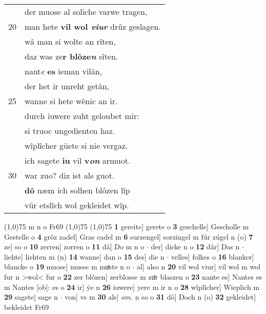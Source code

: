 \documentclass[8pt,a4paper,notitlepage]{article}
\begin{document}
\begin{table}[ht]
\begin{minipage}[t]{0.5\linewidth}
\begin{tabular}{rl}
 & der muose al soliche varwe tragen,\\ 
20 & man hete \textbf{vil wol \textit{viur}} drûz geslagen.\\ 
 & wâ man si wolte an rîten,\\ 
 & daz was ze\textbf{r blôze\textit{n}} sîten.\\ 
 & nant\textit{e} \textbf{es} ieman vilân,\\ 
 & der het ir unreht getân,\\ 
25 & wanne si hete wênic an ir.\\ 
 & durch iuwere zuht geloubet mir:\\ 
 & si truoc ungedienten haz.\\ 
 & wîplîcher güete si nie vergaz.\\ 
 & ich sagete \textbf{iu} vil \textbf{v\textit{on}} armuot.\\ 
30 & war zuo? diz ist als guot.\\ 
 & \textbf{dô} næm ich solhen blôzen lîp\\ 
 & vür etslîch wol gekleidet wîp.\\ 
\end{tabular}
\scriptsize
\line(1,0){75} \newline
m n o Fr69 \newline
\line(1,0){75} \newline
\newline
\line(1,0){75} \newline
\textbf{1} gereite] gerete o \textbf{3} geschelle] Gescholle m Gestelle o \textbf{4} grôz zadel] Gras cadel m \textbf{6} surzengel] sorzingel m fúr zúgel n (o) \textbf{7} ze] so o \textbf{10} zerren] zorren o \textbf{11} dâ] Do m n o  $\cdot$ der] dicke n o \textbf{12} dâr] Das n  $\cdot$ liehte] liehten m (n) \textbf{14} wanne] dan o \textbf{15} des] die n  $\cdot$ velles] folkes o \textbf{16} blanker] blancke o \textbf{19} muose] musse m muͯste n o  $\cdot$ al] also n \textbf{20} vil wol viur] vil wol m wol fur n >wol< fur o \textbf{22} zer blôzen] zerblosse m zuͦr blaszen o \textbf{23} nante es] Nantes es m Nantes [ob]: es o \textbf{24} ir] ẏe n \textbf{26} iuwere] yere m ir n o \textbf{28} wîplîcher] Wieplich m \textbf{29} sagete] sage n  $\cdot$ von] vs m \textbf{30} als] \textit{om.} n so o \textbf{31} dô] Doch n (o) \textbf{32} gekleidet] bekleidet Fr69 \newline
\end{minipage}
\end{table}
\newpage
\end{document}
